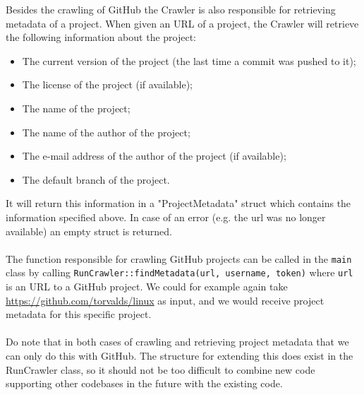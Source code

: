 \documentclass[../Main.tex]{subfiles}
\begin{document}
Besides the crawling of GitHub the Crawler is also responsible for retrieving metadata of a project. When given an URL of a project, the Crawler will retrieve the following information about the project:
\begin{itemize}
    \item The current version of the project (the last time a commit was pushed to it);
    \item The license of the project (if available);
    \item The name of the project;
    \item The name of the author of the project;
    \item The e-mail address of the author of the project (if available);
    \item The default branch of the project.
\end{itemize}
It will return this information in a "ProjectMetadata" struct which contains the information specified above. In case of an error (e.g. the url was no longer available) an empty struct is returned.
~\\
~\\
The function responsible for crawling GitHub projects can be called in the \texttt{main} class by calling \texttt{RunCrawler::findMetadata(url, username, token)}
where \texttt{url} is an URL to a GitHub project. We could for example again take \url{https://github.com/torvalds/linux} as input, and we would receive project metadata for this specific project.
~\\
~\\
Do note that in both cases of crawling and retrieving project metadata that we can only do this with GitHub. The structure for extending this does exist in the RunCrawler class, so it should not be too difficult to combine new code supporting other codebases in the future with the existing code.
\end{document}
